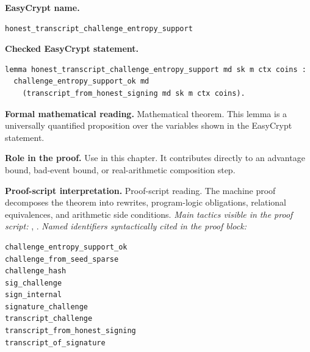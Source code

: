 \begin{formaltheorem}
\noindent\textbf{EasyCrypt name.}
\begin{lstlisting}[language=EasyCrypt,basicstyle=\ttfamily\scriptsize]
honest_transcript_challenge_entropy_support
\end{lstlisting}
\noindent\textbf{Checked EasyCrypt statement.}
\begin{lstlisting}[language=EasyCrypt,basicstyle=\ttfamily\scriptsize]
lemma honest_transcript_challenge_entropy_support md sk m ctx coins :
  challenge_entropy_support_ok md
    (transcript_from_honest_signing md sk m ctx coins).
\end{lstlisting}
\noindent\textbf{Formal mathematical reading.}
Mathematical theorem. This lemma is a universally quantified proposition over the variables shown in the EasyCrypt statement.

\noindent\textbf{Role in the proof.}
Use in this chapter. It contributes directly to an advantage bound, bad-event bound, or real-arithmetic composition step.

\noindent\textbf{Proof-script interpretation.}
Proof-script reading. The machine proof decomposes the theorem into rewrites, program-logic obligations, relational equivalences, and arithmetic side conditions.
\emph{Main tactics visible in the proof script:} , .
\emph{Named identifiers syntactically cited in the proof block:}
\begin{lstlisting}[language=EasyCrypt,basicstyle=\ttfamily\scriptsize]
challenge_entropy_support_ok
challenge_from_seed_sparse
challenge_hash
sig_challenge
sign_internal
signature_challenge
transcript_challenge
transcript_from_honest_signing
transcript_of_signature
\end{lstlisting}

\end{formaltheorem}

